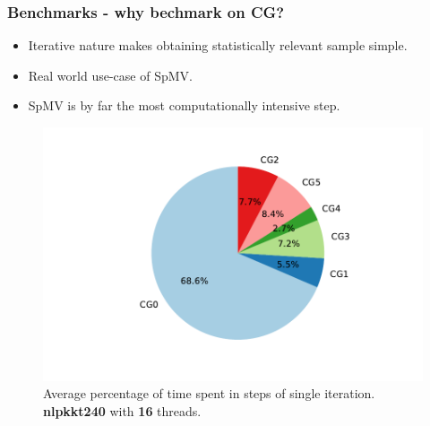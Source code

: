 \documentclass{beamer}
\begin{document}
\begin{frame}
    \frametitle{Benchmarks - why bechmark on CG?}

    \begin{itemize}
        \item Iterative nature makes obtaining statistically relevant sample simple.
        \item Real world use-case of SpMV\@.
        \item SpMV is by far the most computationally intensive step.
    \end{itemize}

    \begin{figure}[htp]
        \centering
        \includegraphics[scale=0.45]{static/cg_sp_nlpkkt240_16.pdf}
        \caption{Average percentage of time spent in steps of single iteration. \textbf{nlpkkt240} with \textbf{16} threads.}
    \end{figure}
\end{frame}
\end{document}

